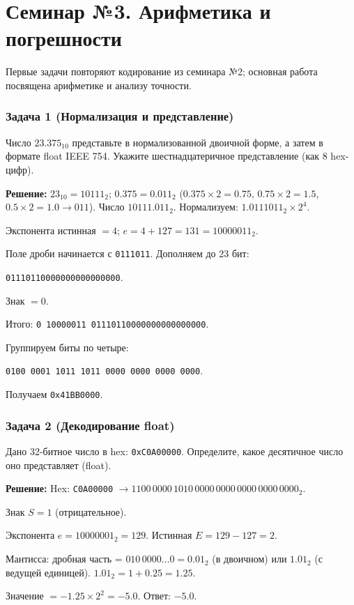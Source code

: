 \newpage
\section{Семинар №3. Арифметика и погрешности}
Первые задачи повторяют кодирование из семинара №2; основная работа
посвящена арифметике и анализу точности.

\subsubsection*{Задача 1 (Нормализация и представление)}
Число $23.375_{10}$ представьте в нормализованной двоичной форме, а затем в формате float IEEE 754. Укажите шестнадцатеричное представление (как 8 hex-цифр).

\textbf{Решение:}
$23_{10} = 10111_2$; $0.375 = 0.011_2$ ($0.375\times2=0.75$, $0.75\times2=1.5$, $0.5\times2=1.0 \to 011$). Число $10111.011_2$. Нормализуем: $1.0111011_2 \times 2^4$.

Экспонента истинная $= 4$; $e = 4+127=131 = 10000011_2$.

Поле дроби начинается с \texttt{0111011}. Дополняем до 23 бит:
\begin{center}\texttt{01110110000000000000000}.\end{center}

Знак $= 0$.

Итого: \texttt{0 10000011 01110110000000000000000}.

Группируем биты по четыре:
\begin{center}\texttt{0100 0001 1011 1011 0000 0000 0000 0000}.\end{center}
Получаем \texttt{0x41BB0000}.

\subsubsection*{Задача 2 (Декодирование float)}
Дано 32-битное число в hex: \texttt{0xC0A00000}. Определите, какое десятичное число оно представляет (float).

\textbf{Решение:}
Hex: \texttt{C0A00000} $\to 1100\,0000\,1010\,0000\,0000\,0000\,0000\,0000_2$.

Знак $S=1$ (отрицательное).

Экспонента $e = 10000001_2 = 129$. Истинная $E = 129 - 127 = 2$.

Мантисса: дробная часть = $010\,0000\ldots0 = 0.01_2$ (в двоичном) или $1.01_2$ (с ведущей единицей). $1.01_2 = 1 + 0.25 = 1.25$.

Значение $= -1.25 \times 2^2 = -5.0$. Ответ: $-5.0$.

